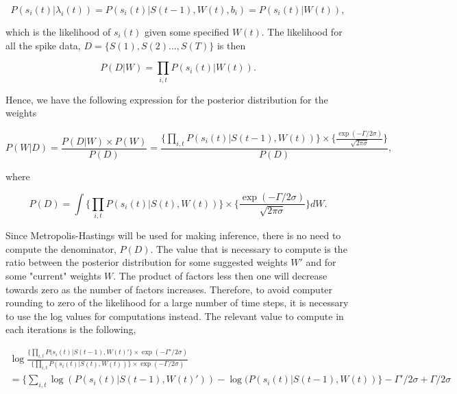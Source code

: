 \begin{equation}
    P(s_i(t)|\lambda_i(t)) = P(s_i(t)|S(t-1),W(t), b_i) = P(s_i(t)|W(t)),
\end{equation}

which is the likelihood of $s_i(t)$ given some specified $W(t)$. The likelihood for all the spike data, $D=\{S(1), S(2)...,S(T)\}$ is then

\begin{equation}
    P(D|W) = \prod_{i,t} P(s_i(t)|W(t)).
\end{equation}

Hence, we have the following expression for the posterior distribution for the weights

\begin{equation}
\label{Posterior}
        P(W|D) = \frac{P(D|W)\times P(W)}{P(D)} = \frac{\Big\{\prod_{i,t} P(s_{i}(t)|S(t-1), W(t))\Big\} \times \Big\{\frac{\exp(-\Gamma /2\sigma)}{\sqrt{2\pi \sigma}}\Big\}}{P(D)}, 
\end{equation}

where

\begin{equation}
        P(D) = \int \Big\{\prod_{i,t} P(s_{i}(t)|S(t), W(t))\Big\} \times \Big\{\frac{\exp(-\Gamma /2\sigma)}{\sqrt{2\pi \sigma}}\Big\} d{W}.
\end{equation}

Since Metropolis-Hastings will be used for making inference, there is no need to compute the denominator, $P(D)$. The value that is necessary to compute is the ratio between the posterior distribution for some suggested weights $W'$ and for some "current" weights $W$. The product of factors less then one will decrease towards zero as the number of factors increases. Therefore, to avoid computer rounding to zero of the likelihood for a large number of time steps, it is necessary to use the log values for computations instead. The relevant value to compute in each iterations is the following,

\begin{equation}
\label{eq:ratio}
\begin{split}
    \log \frac{\big \{ \prod_{i,t} P(s_{i}(t)|S(t-1), W(t)'\big \} \times \exp(-\Gamma' /2\sigma)}{\big \{ \prod_{i,t}  P(s_{i}(t)|S(t), W(t)) \big \} \times \exp(-\Gamma /2\sigma)} \\
    = \Big \{ \sum_{i,t} \log( P(s_{i}(t)|S(t-1), W(t)')) - \log( P(s_{i}(t)|S(t-1), W(t)) \Big \} -\Gamma' /2\sigma +  \Gamma /2\sigma
\end{split}
\end{equation}

